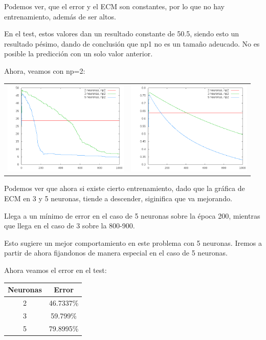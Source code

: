 \documentclass[12pt]{article}
\begin{document}
Podemos ver, que el error y el ECM son constantes, por lo que no hay entrenamiento, además de ser altos.

En el test, estos valores dan un resultado constante de 50.5, siendo esto un resultado pésimo, dando de conclusión que np1 no es un tamaño adeucado. No es posible la predicción con un solo valor anterior.

Ahora, veamos con np=2:

\begin{center}
   \begin{tabular}{ c  c }
     \includegraphics[width=6cm]{graficosparte2a/error_train_np2_25} &
     \includegraphics[width=6cm]{graficosparte2a/ecm_train_np2_25}\\ 
   \end{tabular}
 \end{center}
 
 Podemos ver que ahora si existe cierto entrenamiento, dado que la gráfica de ECM en 3 y 5 neuronas, tiende a descender, siginifica que va mejorando.
 
 Llega a un mínimo de error en el caso de 5 neuronas sobre la época 200, mientras que llega en el caso de 3 sobre la 800-900.
 
 Esto sugiere un mejor comportamiento en este problema con 5 neuronas. Iremos a partir de ahora fijandonos de manera especial en el caso de 5 neuronas.
 
 Ahora veamos el error en el test:
 
\begin{center}
	\begin{tabular}{| c | c |}
		\hline
		Neuronas & Error \\ \hline
		2 & 46.7337\% \\ \hline
		3 & 59.799\% \\ \hline
		5 & 79.8995\% \\ \hline
	\end{tabular}
\end{center}
\end{document}
